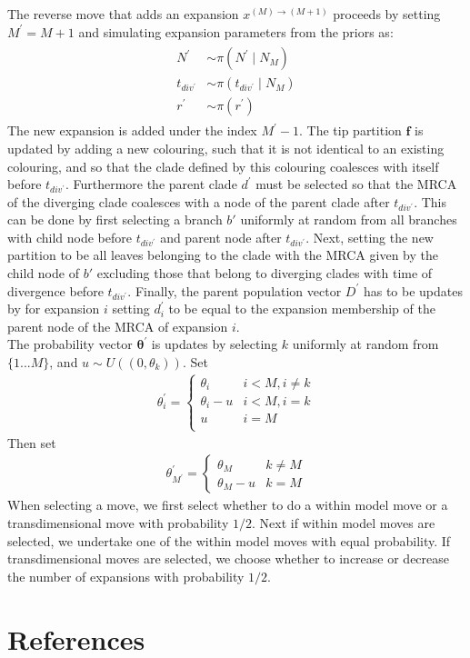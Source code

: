 \documentclass{report}
\theoremstyle{definition}
\begin{document}
The reverse move that adds an expansion $x^{(M)\to(M+1)}$ 
proceeds by setting $M^{'} = M+1$ and simulating expansion parameters from the priors as:
\begin{gather}
\begin{aligned}
N^{'} &\sim \pi(N^{'}\mid N_{M})\\
t_{div^{'}} &\sim \pi(t_{div^{'}}\mid N_{M})\\
r^{'} &\sim \pi(r^{'})
\end{aligned}
\end{gather}
The new expansion is added under the index $M^{'}-1$. The tip partition $\mathbf{f}$ is updated by adding a new colouring, such that it is not identical to an existing colouring, and so that the clade defined by this colouring coalesces with itself before $t_{div^{'}}$. Furthermore the parent clade $d^{'}$ must be selected so that the MRCA of the diverging clade coalesces with a node of the parent clade after $t_{div^{'}}$. This can be done by first selecting a branch $b'$ uniformly at random from all branches with child node before $t_{div^{'}}$ and parent node after $t_{div^{'}}$. Next, setting the new partition to be all leaves belonging to the clade with the MRCA given by the child node of $b'$ excluding those that belong to diverging clades with time of divergence before $t_{div^{'}}$. Finally, the parent population vector $D^{'}$ has to be updates by for expansion $i$ setting $d_i^{'}$ to be equal to the expansion membership of the parent node of the MRCA of expansion $i$.\\
The probability vector $\pmb\theta^{'}$ is updates by selecting $k$ uniformly at random from $\{1...M\}$, and $u\sim U((0, \theta_k))$. Set 
\begin{gather}
  \theta^{'}_i = 
  \begin{cases} 
      \theta_i & i < M, i \neq k \\
      \theta_i-u& i < M, i = k \\
      u & i = M\\
  \end{cases}
\end{gather}
Then set 
\begin{gather}
  \theta^{'}_{M^{'}} = 
  \begin{cases} 
      \theta_M & k \neq M \\
      \theta_M-u& k=M
  \end{cases}
\end{gather}
When selecting a move, we first select whether to do a within model move or a transdimensional move with probability $1/2$.
Next if within model moves are selected, we undertake one of the within model moves with equal probability. If transdimensional moves are selected, we choose whether to increase or decrease the number of expansions with probability $1/2$.
\chapter{References}
\printbibliography
\end{document}
